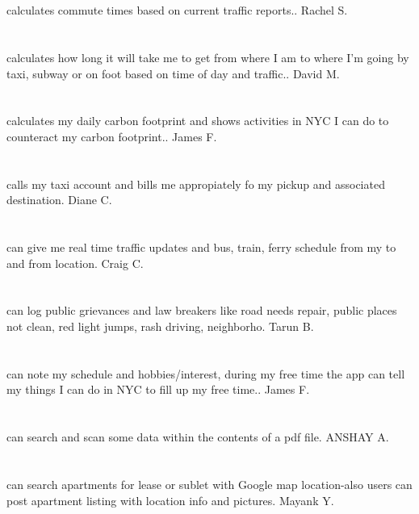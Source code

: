 \section{}calculates commute times based on current traffic reports.. Rachel S.
\section{}calculates how long it will take me to get from where I am to where I'm going by taxi,  subway or on foot based on time of day and traffic.. David M.
\section{}calculates my daily carbon footprint and shows activities in NYC I can do to counteract my carbon footprint.. James F.
\section{}calls my taxi account and bills me appropiately fo my pickup and associated destination.  Diane C.
\section{} can give me real time traffic updates and bus, train, ferry schedule from my to and from location. Craig C.
\section{}can log public grievances and  law breakers like road needs repair,  public places not clean,  red light jumps,  rash driving,  neighborho. Tarun B.
\section{}can note my schedule and hobbies/interest,  during my free time the app can tell my things I can do in NYC to fill up my free time.. James F.
\section{}can search and scan some data within the contents of a pdf file. ANSHAY A.
\section{}can search apartments for lease or sublet with Google map location-also users can post apartment listing with location info and pictures. Mayank Y.
